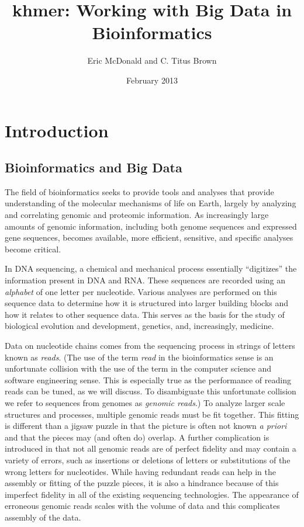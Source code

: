 \documentclass{article}
\title{khmer: Working with Big Data in Bioinformatics}
\author{Eric McDonald and C. Titus Brown}
\date{February 2013}
\begin{document}
\maketitle

\section{Introduction}

\subsection{Bioinformatics and Big Data}

The field of bioinformatics seeks to provide tools and analyses that
provide understanding of the molecular mechanisms of life on Earth,
largely by analyzing and correlating genomic and proteomic information.
As increasingly large amounts of genomic information, including both
genome sequences and expressed gene sequences, becomes available,
more efficient, sensitive, and specific analyses become critical.

In DNA sequencing, a chemical and mechanical process essentially
``digitizes'' the information present in DNA and RNA. These sequences
are recorded using an \textit{alphabet} of one letter per
nucleotide. Various analyses are performed on this sequence data to
determine how it is structured into larger building blocks and how it
relates to other sequence data. This serves as the basis for the study
of biological evolution and development, genetics, and, increasingly,
medicine.

Data on nucleotide chains comes from the sequencing process in strings of
letters known as \textit{reads}. (The use of the term \textit{read} in the
bioinformatics sense is an unfortunate collision with the use of the term in
the computer science and software engineering sense. This is especially true as
the performance of reading reads can be tuned, as we will discuss. To
disambiguate this unfortunate collision we refer to sequences from genomes as
\textit{genomic reads}.) To analyze larger scale structures and processes,
multiple genomic reads must be fit together. This fitting is different than a
jigsaw puzzle in that the picture is often not known \textit{a priori} and that
the pieces may (and often do) overlap. A further complication is introduced in
that not all genomic reads are of perfect fidelity and may contain a variety of
errors, such as insertions or deletions of letters or substitutions of the
wrong letters for nucleotides. While having redundant reads can help in the
assembly or fitting of the puzzle pieces, it is also a hindrance because of
this imperfect fidelity in all of the existing sequencing technologies. The
appearance of erroneous genomic reads scales with the volume of data and this
complicates assembly of the data.
\end{document}
